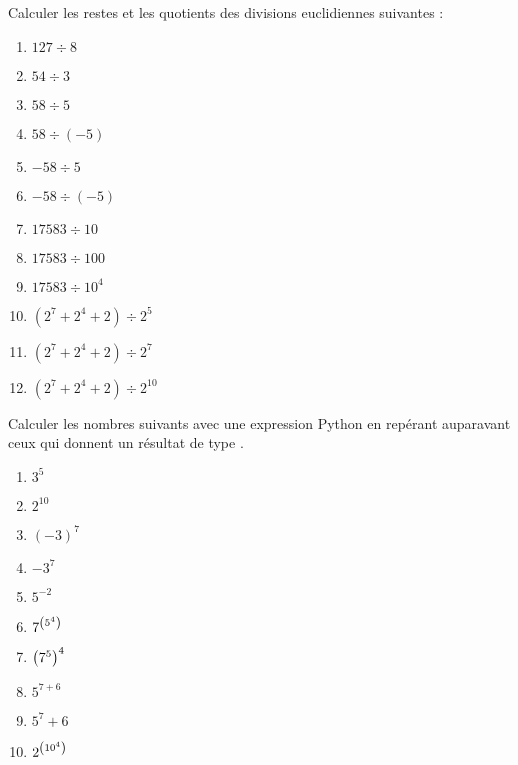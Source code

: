 Calculer les restes et les quotients des divisions euclidiennes suivantes : 
\begin{multicols}{4}
  \begin{enumerate}[label=\emph{\alph*)}]
    \item $127 \div 8$
    \item $54 \div 3$
    \item $58 \div 5$
    \item $58 \div (-5)$
    \item $-58 \div 5$
    \item $-58 \div (-5)$
    \item $17583 \div 10$
    \item $17583 \div 100$
    \item $17583 \div 10^4$
    \item $(2^7+2^4+2) \div 2^5$
    \item $(2^7+2^4+2) \div 2^7$
    \item $(2^7+2^4+2) \div 2^{10}$
  \end{enumerate}
\end{multicols}
Calculer les nombres suivants avec une expression Python en repérant auparavant ceux qui donnent un résultat de type .
\begin{multicols}{5}
  \begin{enumerate}[label=\emph{\alph*)}]
    \item $3^5$
    \item $2^{10}$
    \item $(-3)^7$
    \item $-3^7$
    \item $5^{-2}$
    \item $7^{\left(5^4\right)}$
    \item $\left(7^5\right)^4$
    \item $5^{7+6}$
    \item $5^7+6$
    \item $2^{\left(10^4\right)}$
  \end{enumerate}
\end{multicols}

